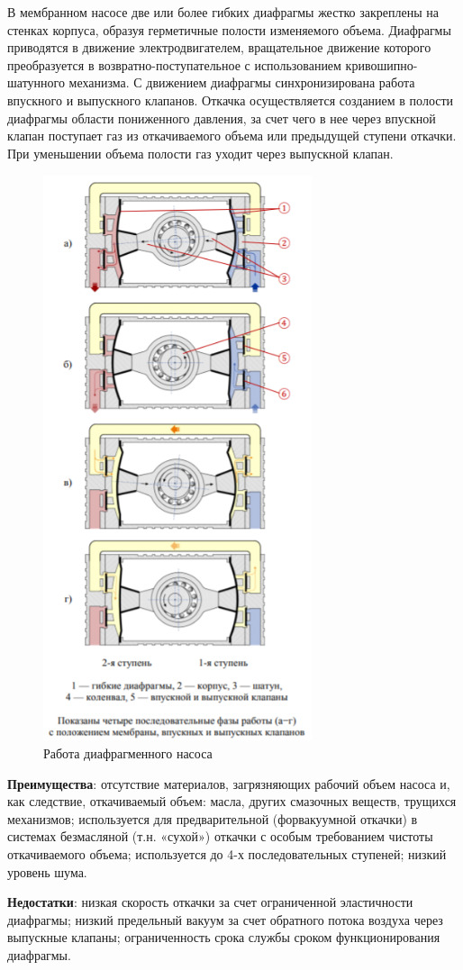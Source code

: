 \documentclass[a4paper, 12pt]{article} %
\begin{document}
В мембранном насосе две или более гибких диафрагмы жестко закреплены на стенках корпуса, образуя герметичные полости изменяемого объема. Диафрагмы приводятся в движение
электродвигателем, вращательное движение которого преобразуется
в возвратно-поступательное с использованием кривошипно-шатунного
механизма. С движением диафрагмы синхронизирована работа
впускного и выпускного клапанов. Откачка осуществляется созданием
в полости диафрагмы области пониженного давления, за счет чего в нее через впускной клапан поступает газ из откачиваемого объема или предыдущей ступени откачки. При уменьшении объема полости газ уходит через выпускной клапан.

\begin{figure}[h]
    \centering
    \includegraphics[width = 6 cm]{2}
    \caption{Работа диафрагменного насоса}
    \label{fig:vac}
\end{figure}

\textbf{Преимущества}: отсутствие материалов, загрязняющих рабочий
объем насоса и, как следствие, откачиваемый объем: масла, других смазочных веществ, трущихся механизмов; используется для предварительной (форвакуумной откачки) в системах безмасляной (т.н. «сухой») откачки с особым требованием чистоты откачиваемого объема; используется до 4-х последовательных ступеней; низкий уровень шума.

\textbf{Недостатки}: низкая скорость откачки за счет ограниченной эластичности диафрагмы; низкий предельный вакуум за счет обратного потока воздуха через выпускные клапаны; ограниченность срока службы
сроком функционирования диафрагмы.
\end{document}
